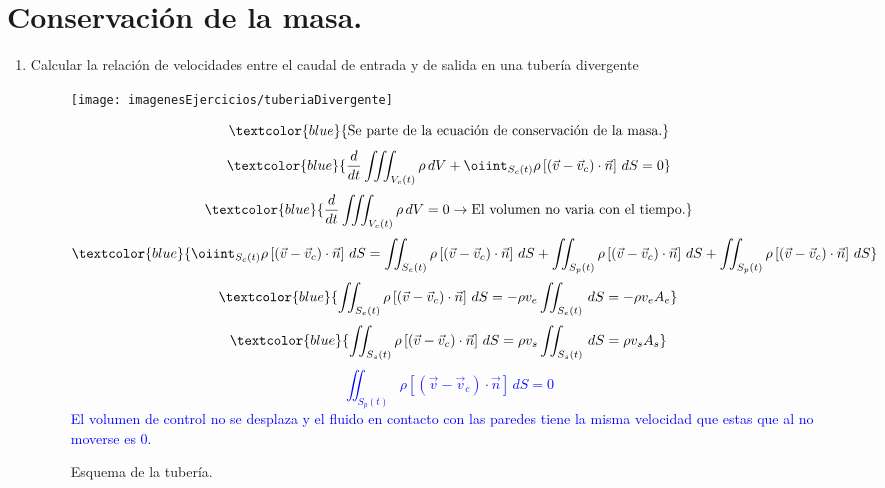 \section{Conservación de la masa.}
\begin{enumerate}
	\item  Calcular la relación de velocidades entre el caudal de entrada y de salida en una tubería divergente
	\begin{figure}[H]

		\centering
		\texttt{[image: imagenesEjercicios/tuberiaDivergente]}
		\caption{Esquema de la tubería.}
		\label{fig:tuberiadivergente}

	\[\textcolor{blue}{\text{Se parte de la ecuación de conservación de la masa.}}\]
	\[\textcolor{blue}{\dfrac{d}{dt}\iiint_{V_c(t)}\rho\,dV+\oiint_{S_c(t)} \rho\left[(\vec{v}-\vec{v}_c)\cdot\vec{n}\right] \,dS=0}\]
\[\textcolor{blue}{
	\dfrac{d}{dt}\iiint_{V_c(t)}\rho\,dV=0 \rightarrow \text{El volumen no varia con el tiempo.}
}\]
\[\textcolor{blue}{
	\oiint_{S_c(t)} \rho\left[(\vec{v}-\vec{v}_c)\cdot\vec{n}\right] \,dS=
	\iint_{S_e(t)} \rho\left[(\vec{v}-\vec{v}_c)\cdot\vec{n}\right] \,dS+
	\iint_{S_p(t)} \rho\left[(\vec{v}-\vec{v}_c)\cdot\vec{n}\right] \,dS+
	\iint_{S_p(t)} \rho\left[(\vec{v}-\vec{v}_c)\cdot\vec{n}\right] \,dS
}\]
\[\textcolor{blue}{
	\iint_{S_e(t)} \rho\left[(\vec{v}-\vec{v}_c)\cdot\vec{n}\right] \,dS=-\rho v_e \iint_{S_e(t)}  \,dS=-\rho v_e A_e
}\]
\[\textcolor{blue}{
	\iint_{S_s(t)} \rho\left[(\vec{v}-\vec{v}_c)\cdot\vec{n}\right] \,dS=\rho v_s \iint_{S_s(t)}  \,dS=\rho v_s A_s
}\]
\textcolor{blue}{
	\[\iint_{S_p(t)} \rho\left[(\vec{v}-\vec{v}_c)\cdot\vec{n}\right] \,dS=0 \]
	 El volumen de control no se desplaza y el fluido  en contacto con las paredes tiene la misma velocidad que estas que al no moverse es 0.}


\end{figure}
\end{enumerate}
